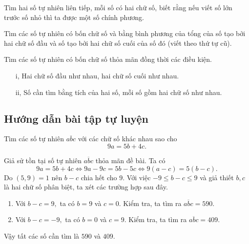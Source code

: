 \begin{btt}
Tìm hai số tự nhiên liên tiếp, mỗi số có hai chữ số, biết rằng nếu viết số lớn trước số nhỏ thì ta được một số chính phương.
\end{btt}

\begin{btt}
Tìm các số tự nhiên có bốn chữ số và bằng bình phương của tổng của số tạo bởi hai chữ số đầu và số tạo bởi hai chữ số cuối của số đó (viết theo thứ tự cũ).
\end{btt}

\begin{btt}
Tìm các số tự nhiên có bốn chữ số thỏa mãn đồng thời các điều kiện. 
\begin{enumerate}
\item[i,] Hai chữ số đầu như nhau, hai chữ số cuối như nhau.
\item[ii,] Số cần tìm  bằng tích của hai số, mỗi số gồm hai chữ số như nhau.
\end{enumerate}
\end{btt}

\subsection*{Hướng dẫn bài tập tự luyện}

\begin{gbtt}
Tìm các số tự nhiên $\overline{abc}$ với các chữ số khác nhau sao cho
\[9a = 5b + 4c.\]
\loigiai
{Giả sử tồn tại số tự nhiên $\overline{abc}$ thỏa mãn đề bài. Ta có
$$9a = 5b + 4c \Leftrightarrow 9a - 9c = 5b - 5c \Leftrightarrow 9(a - c) = 5(b - c).$$    
Do $(5,9)=1$ nên $b-c$ chia hết cho $9.$ Với việc $-9\le b-c\le 9$ và giả thiết $b,c$ là hai chữ số phân biệt, ta xét các trường hợp sau đây.
\begin{enumerate}
   \item Với $b-c=9,$ ta có $b=9$ và $c=0.$
   Kiểm tra, ta tìm ra $\overline{abc}=590.$
   \item Với $b-c=-9,$ ta có $b=0$ và $c=9.$
   Kiểm tra, ta tìm ra $\overline{abc}=409.$
\end{enumerate}
Vậy tất các số cần tìm là $590$ và $409$.}
\end{gbtt}

